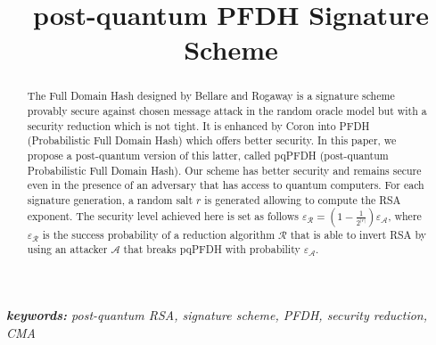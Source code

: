 \documentclass[a4paper,11pt]{article}
\begin{document}
\title{post-quantum PFDH Signature Scheme}
\maketitle
\begin{abstract}
The Full Domain Hash designed by Bellare and Rogaway is a signature scheme provably secure against chosen message attack in the random oracle model but with a security reduction which is not tight. It is enhanced by Coron into PFDH (Probabilistic Full Domain Hash) which offers better security. In this paper, we propose a post-quantum version of this latter, called pqPFDH (post-quantum Probabilistic Full Domain Hash). Our scheme has better security and remains secure even in the presence of an adversary that has access to quantum computers. For each signature generation, a random salt $r$ is generated allowing to compute the RSA exponent. The security level achieved here is set as follows $\varepsilon_\mathcal{R}=(1-\frac{1}{2^{|r|}})\varepsilon_\mathcal{A}$, where $\varepsilon_{\mathcal{R}}$  is the success probability of a reduction algorithm $\mathcal{R}$ that is able to invert RSA by using an attacker $\mathcal{A}$ that breaks pqPFDH with probability $\varepsilon_{\mathcal{A}}$.
\end{abstract}
{\it \textbf{keywords:} post-quantum RSA, signature scheme, PFDH, security reduction, CMA}
\end{document}
